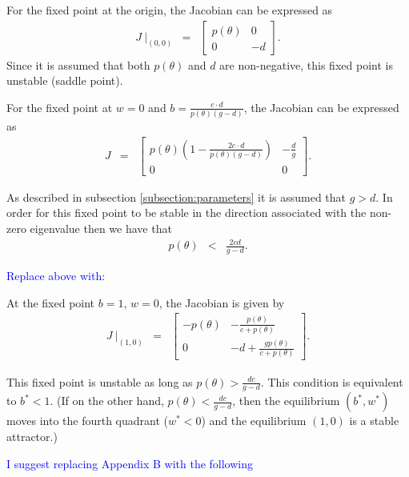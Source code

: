 \documentclass[review,authoryear]{elsarticle}
\begin{document}
For the fixed point at the origin, the Jacobian can be expressed as 
\begin{eqnarray*}
  J~\bigg|_{(0,0)} & = & \left[
          \begin{array}{rr}
            p(\theta) & 0 \\
            0 & -d
          \end{array}
          \right].
\end{eqnarray*}
Since it is assumed that both $p(\theta)$ and $d$ are non-negative, this fixed point  is unstable  (saddle point).

For the fixed point at $w=0$ and
$b=\frac{c\cdot d}{p(\theta)\left(g - d\right)}$, the Jacobian can be
expressed as 
\begin{eqnarray*}
  J & = & \left[
          \begin{array}{cc}
            p(\theta)\left( 1 -
            \frac{2c\cdot d}{p(\theta)(g-d)} \right) & -\frac{d}{g} \\
            0 & 0
          \end{array}
          \right].
\end{eqnarray*}

As described in subsection \ref{subsection:parameters} it is assumed
that $g>d$. In order for this fixed point to be stable in the
direction associated with the non-zero eigenvalue then we have that
\begin{eqnarray*}
  p(\theta) & < & \frac{2cd}{g-d}.
\end{eqnarray*}

\textcolor{blue}{Replace above with:}

At the fixed point $b=1$, $w=0$, the Jacobian is given by 
\begin{eqnarray*}
  J~\bigg|_{(1,0)} & = & \left[
          \begin{array}{cc}
            -p(\theta) & -\frac{p(\theta)}{c+p(\theta)} \\
            0 & -d+\frac{gp(\theta)}{c+p(\theta)}
          \end{array}
          \right].
\end{eqnarray*}

This fixed point is unstable as long as $p(\theta) >\frac{dc}{g-d}$.  This condition is equivalent to $b^* < 1$.  (If on the other hand, $p(\theta) <\frac{dc}{g-d}$, then the equilibrium $(b^*,w^*)$ moves into the fourth quadrant ($w^*<0$) and the equilibrium $(1,0)$ is a stable attractor.)

\textcolor{blue}{I suggest replacing Appendix B with the following}
\end{document}
